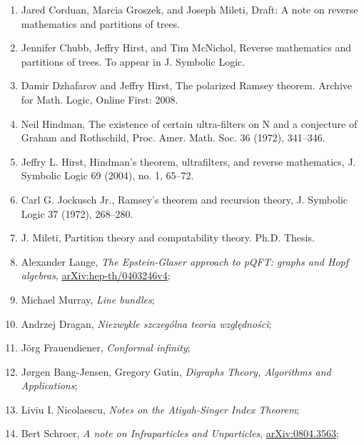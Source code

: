 \documentclass[a4paper,11pt]{article}
\begin{document}
\begin{enumerate}
\item Jared Corduan, Marcia Groszek, and Joseph Mileti, Draft: A note
  on reverse mathematics and partitions of trees.

\item Jennifer Chubb, Jeffry Hirst, and Tim McNichol, Reverse
  mathematics and partitions of trees. To appear in J. Symbolic Logic.

\item Damir Dzhafarov and Jeffry Hirst, The polarized Ramsey theorem.
  Archive for Math. Logic, Online First: 2008.

\item Neil Hindman, The existence of certain ultra-filters on N and a
  conjecture of Graham and Rothschild, Proc. Amer. Math. Soc. 36
  (1972), 341–346.

\item Jeffry L. Hirst, Hindman’s theorem, ultrafilters, and reverse
  mathematics, J. Symbolic Logic 69 (2004), no. 1, 65–72.

\item Carl G. Jockusch Jr., Ramsey’s theorem and recursion theory, J.
  Symbolic Logic 37 (1972), 268–280.

\item J. Mileti, Partition theory and computability theory. Ph.D.
  Thesis.

\item Alexander Lange, \textit{The Epstein-Glaser approach to pQFT:
    graphs and Hopf algebras},
  \href{https://arxiv.org/abs/hep-th/0403246v4}{arXiv:hep-th/0403246v4};

\item Michael Murray, \textit{Line bundles};

\item Andrzej Dragan, \textit{Niezwykle szczególna teoria
    względności};

\item J\"{o}rg Frauendiener, \textit{Conformal infinity};

\item J\o rgen Bang-Jensen, Gregory Gutin, \textit{Digraphs Theory,
    Algorithms and Applications};

\item Liviu I. Nicolaescu, \textit{Notes on the Atiyah-Singer Index
    Theorem};

\item Bert Schroer, \textit{A note on Infraparticles and Unparticles},
  \href{https://arxiv.org/abs/0804.3563}{arXiv:0804.3563};


\end{enumerate}
\end{document}
